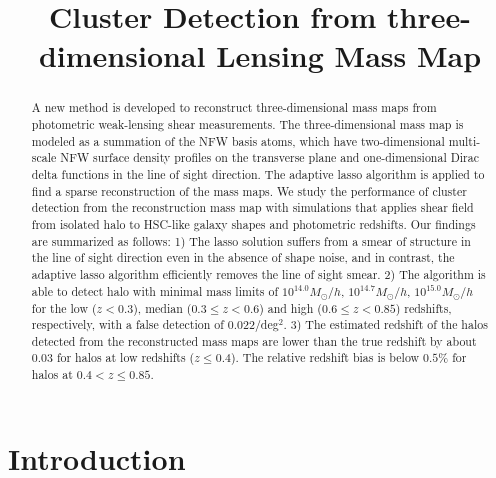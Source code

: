 \documentclass[twocolumn]{aastex63}
\begin{document}
\title{Cluster Detection from three-dimensional Lensing Mass Map}

\begin{abstract}
A new method is developed to reconstruct three-dimensional mass maps from
photometric weak-lensing shear measurements. The three-dimensional mass map is
modeled as a summation of the NFW basis atoms, which have two-dimensional
multi-scale NFW surface density profiles on the transverse plane and
one-dimensional Dirac delta functions in the line of sight direction.  The
adaptive lasso algorithm is applied to find a sparse reconstruction of the mass
maps.
We study the performance of cluster detection from the reconstruction mass map
with simulations that applies shear field from isolated halo to HSC-like galaxy
shapes and photometric redshifts.
Our findings are summarized as follows:
1) The lasso solution suffers from a smear of structure in the line of sight
direction even in the absence of shape noise, and in contrast, the adaptive
lasso algorithm efficiently removes the line of sight smear.
2) The algorithm is able to detect halo with minimal mass limits of $10^{14.0}
M_{\odot}/h$, $10^{14.7} M_{\odot}/h$, $10^{15.0} M_{\odot}/h$ for the low
($z<0.3$), median ($0.3\leq z< 0.6$) and high ($0.6\leq z< 0.85$) redshifts,
respectively, with a false detection of 0.022/deg$^2$.
3) The estimated redshift of the halos detected from the reconstructed mass
maps are lower than the true redshift by about $0.03$ for halos at low
redshifts ($z\leq 0.4$). The relative redshift bias is below $0.5\%$ for halos
at $0.4<z\leq 0.85$.
\end{abstract}

\section{Introduction}
\end{document}

